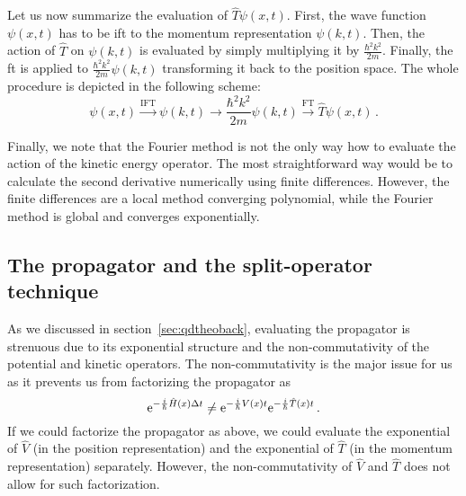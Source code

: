 Let us now summarize the evaluation of $\hat{T}\psi(x,t)$. First, the wave function $\psi(x,t)$ has to be \acrshort{ift} to the momentum representation $\psi(k,t)$. Then, the action of $\hat{T}$ on $\psi(k,t)$ is evaluated by simply multiplying it by $\frac{\hbar^2 k^2}{2m}$. Finally, the \acrshort{ft} is applied to $\frac{\hbar^2 k^2}{2m} \psi(k,t)$ transforming it back to the position space. The whole procedure is depicted in the following scheme:
\begin{equation}
    \psi(x,t) \stackrel{\mathrm{IFT}}{\longrightarrow} \psi(k,t) \longrightarrow \frac{\hbar^2 k^2}{2m} \psi(k,t) \stackrel{\mathrm{FT}}{\longrightarrow} \hat{T}\psi(x,t) \, .
\end{equation}

Finally, we note that the Fourier method is not the only way how to evaluate the action of the kinetic energy operator. The most straightforward way would be to calculate the second derivative numerically using finite differences. However, the finite differences are a local method converging polynomial, while the Fourier method is global and converges exponentially.

\subsection{The propagator and the split-operator technique}

As we discussed in section~\ref{sec:qdtheoback}, evaluating the propagator is strenuous due to its exponential structure and the non-commutativity of the potential and kinetic operators. The non-commutativity is the major issue for us as it prevents us from factorizing the propagator as
\begin{equation}
    \mathrm{e}^{-\frac{i}{\hbar}\hat{H}(x)\Delta t} \neq \mathrm{e}^{-\frac{i}{\hbar}V(x)t}\mathrm{e}^{-\frac{i}{\hbar}\hat{T}(x)t}\, .
\end{equation}
If we could factorize the propagator as above, we could evaluate the exponential of $\hat{V}$ (in the position representation) and the exponential of $\hat{T}$ (in the momentum representation) separately. However, the non-commutativity of $\hat{V}$ and $\hat{T}$ does not allow for such factorization.

